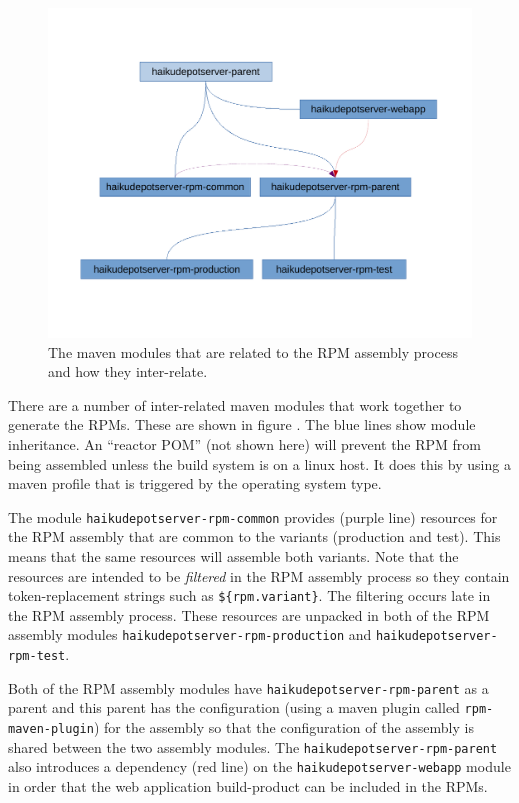 \begin{figure}
\centering
\vspace{.2in}
\includegraphics[width=6.5in]{img-rpm-package-assembly-diagram.pdf}
\caption{The maven modules that are related to the RPM assembly process and how they inter-relate.}
\label{\thefigure}
\end{figure}

There are a number of inter-related maven modules that work together to generate the RPMs.  These are shown in figure {\thefigure}.  The blue lines show module inheritance.  An ``reactor POM'' (not shown here) will prevent the RPM from being assembled unless the build system is on a linux host.  It does this by using a maven profile that is triggered by the operating system type.

The module {\tt haikudepotserver-rpm-common} provides (purple line) resources for the RPM assembly that are common to the variants (production and test).  This means that the same resources will assemble both variants.  Note that the resources are intended to be {\it filtered} in the RPM assembly process so they contain token-replacement strings such as {\tt \$\{rpm.variant\}}.  The filtering occurs late in the RPM assembly process.  These resources are unpacked in both of the RPM assembly modules {\tt haikudepotserver-rpm-production} and {\tt haikudepotserver-rpm-test}.

Both of the RPM assembly modules have {\tt haikudepotserver-rpm-parent} as a parent and this parent has the configuration (using a maven plugin called {\tt rpm-maven-plugin}) for the assembly so that the configuration of the assembly is shared between the two assembly modules.  The {\tt haikudepotserver-rpm-parent} also introduces a dependency (red line) on the {\tt haikudepotserver-webapp} module in order that the web application build-product can be included in the RPMs.